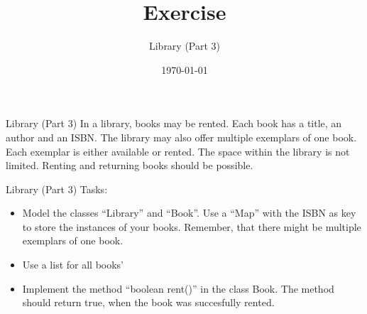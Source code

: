 


\title{Exercise}
\subtitle{Library (Part 3)}
\date{\today}




\begin{frame}
    \titlepage
\end{frame}

\begin{frame}[fragile]{Library (Part 3)}
    In a library, books may be rented. Each book has a title, an author and an ISBN. The library may also offer multiple exemplars of one book. Each exemplar is either available or rented. The space within the library is not limited. Renting and returning books should be possible.
\end{frame}

\begin{frame}{Library (Part 3)}
    Tasks:
    \begin{itemize}
        \item Model the classes ``Library'' and ``Book''. Use a ``Map'' with the ISBN as key to store the instances of your books. Remember, that there might be multiple exemplars of one book.
        \item Use a list for all books'
        \item Implement the method ``boolean rent()'' in the class Book. The method should return true, when the book was succesfully rented.
    \end{itemize}
\end{frame}


